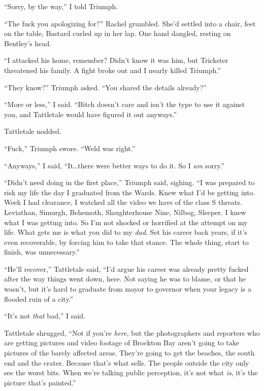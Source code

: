 ``Sorry, by the way,'' I told Triumph.



``The fuck you apologizing for?'' Rachel grumbled.  She'd settled into a chair, feet on the table, Bastard curled up in her lap.  One hand dangled, resting on Bentley's head.



``I attacked his home, remember?  Didn't know it was him, but Trickster threatened his family.  A fight broke out and I nearly killed Triumph.''



``They know?''  Triumph asked.  ``You shared the details already?''



``More or less,'' I said.  ``Bitch doesn't care and isn't the type to use it against you, and Tattletale would have figured it out anyways.''



Tattletale nodded.



``Fuck,'' Triumph swore.  ``Weld was right.''



``Anyways,'' I said, ``It\ldots there were better ways to do it.  So I \emph{am} sorry.''



``Didn't need doing in the first place,'' Triumph said, sighing.  ``I was prepared to risk my life the day I graduated from the Wards.  Knew what I'd be getting into.  Week I had clearance, I watched all the video we have of the class S threats.  Leviathan, Simurgh, Behemoth, Slaughterhouse Nine, Nilbog, Sleeper.  I knew what I was getting into.  So I'm not shocked or horrified at the attempt on my life.  What gets me is what you did to my \emph{dad}.  Set his career back years, if it's even recoverable, by forcing him to take that stance.  The whole thing, start to finish, was unnecessary.''



``He'll recover,'' Tattletale said, ``I'd argue his career was already pretty fucked after the way things went down, here.  Not saying he was to blame, or that he wasn't, but it's hard to graduate from mayor to governor when your legacy is a flooded ruin of a city.''



``It's not \emph{that} bad,'' I said.



Tattletale shrugged, ``Not if you're \emph{here}, but the photographers and reporters who are getting pictures and video footage of Brockton Bay aren't going to take pictures of the barely affected areas.  They're going to get the beaches, the south end and the crater.  Because that's what sells.  The people outside the city only see the worst bits.  When we're talking public perception, it's not what \emph{is}, it's the picture that's painted.''



